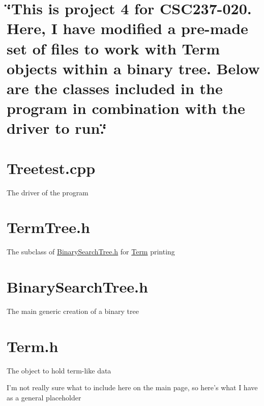 \subparagraph*{}\hypertarget{index_intro_sec}{}\section{\char`\"{}\-This is project 4 for C\-S\-C237-\/020. Here, I have modified a pre-\/made set of files to work with Term objects within a binary tree. Below are the classes included in the program in combination with the driver to run.\char`\"{}}\label{index_intro_sec}
\hypertarget{index_class1}{}\section{Treetest.\-cpp}\label{index_class1}
The driver of the program \hypertarget{index_class2}{}\section{Term\-Tree.\-h}\label{index_class2}
The subclass of \hyperlink{BinarySearchTree_8h}{Binary\-Search\-Tree.\-h} for \hyperlink{classTerm}{Term} printing \hypertarget{index_class3}{}\section{Binary\-Search\-Tree.\-h}\label{index_class3}
The main generic creation of a binary tree \hypertarget{index_class4}{}\section{Term.\-h}\label{index_class4}
The object to hold term-\/like data

I'm not really sure what to include here on the main page, so here's what I have as a general placeholder 